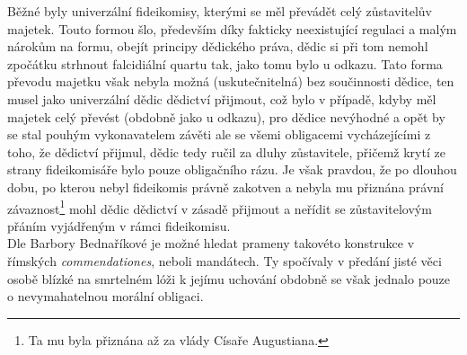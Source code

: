 \documentclass{article}
\begin{document}

Běžné byly univerzální fideikomisy, kterými se měl převádět celý zůstavitelův majetek. Touto formou šlo, především díky fakticky neexistující regulaci a malým nárokům na formu, obejít principy dědického práva, dědic si při tom nemohl zpočátku strhnout falcidiální quartu tak, jako tomu bylo u odkazu. Tato forma převodu majetku však nebyla možná (uskutečnitelná) bez součinnosti dědice, ten musel jako univerzální dědic dědictví přijmout, což bylo v případě, kdyby měl majetek celý převést (obdobně jako u odkazu), pro dědice nevýhodné a opět by se stal pouhým vykonavatelem závěti ale se všemi obligacemi vycháze\-jícími z toho, že dědictví přijmul, dědic tedy ručil za dluhy zůstavitele, přičemž krytí ze strany fideikomisáře bylo pouze obligačního rázu. Je však pravdou, že po dlouhou dobu, po kterou nebyl fideikomis právně zakotven a nebyla mu přiznána právní závaznost\footnote{Ta mu byla přiznána až za vlády Císaře Augustiana.} mohl dědic dědictví v zásadě přijmout a neřídit se zůstavitelovým přáním vyjádřeným v rámci fideikomisu.\\


Dle Barbory Bednaříkové je možné hledat prameny takovéto konstrukce v římských \textit{commendationes}, neboli mandátech. Ty spočívaly v předání jisté věci osobě blízké na smrtelném lóži k jejímu uchování obdobně se však jednalo pouze o nevymahatelnou morální obligaci.\\

\end{document}
